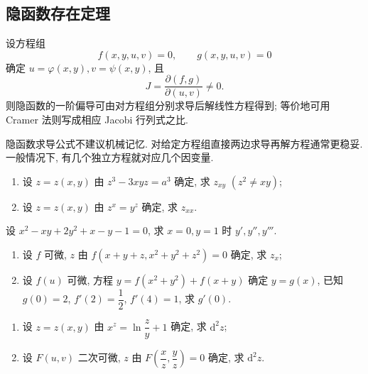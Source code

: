 \documentclass[../数学分析培优讲义.tex]{subfiles}
\begin{document}
\subsection{隐函数存在定理}

\begin{theorem}[\markstar]
设方程组
\[
    f(x,y,u,v)=0,\qquad g(x,y,u,v)=0
\]
确定 $u=\varphi(x,y),v=\psi(x,y)$, 且
\[
    J=\dfrac{\partial(f,g)}{\partial(u,v)}\ne0.
\]
则隐函数的一阶偏导可由对方程组分别求导后解线性方程得到; 等价地可用 Cramer 法则写成相应 Jacobi 行列式之比.
\end{theorem}

\begin{remark}
隐函数求导公式不建议机械记忆. 对给定方程组直接两边求导再解方程通常更稳妥. 一般情况下, 有几个独立方程就对应几个因变量.
\end{remark}


\newpage


\begin{example}
\begin{enumerate}[label=(\arabic*)]
    \item 设 $z=z(x,y)$ 由 $z^3-3xyz=a^3$ 确定, 求 $z_{xy}$ $(z^2\ne xy)$;
    \item 设 $z=z(x,y)$ 由 $z^x=y^z$ 确定, 求 $z_{xx}$.
\end{enumerate}
\end{example}
\exampleblank

\begin{example}
设 $x^2-xy+2y^2+x-y-1=0$, 求 $x=0,y=1$ 时 $y',y'',y'''$.
\end{example}
\exampleblank

\begin{example}
\begin{enumerate}[label=(\arabic*)]
    \item 设 $f$ 可微, $z$ 由 $f(x+y+z,x^2+y^2+z^2)=0$ 确定, 求 $z_x$;
    \item 设 $f(u)$ 可微, 方程 $y=f(x^2+y^2)+f(x+y)$ 确定 $y=g(x)$, 已知 $g(0)=2$, $f'(2)=\dfrac{1}{2}$, $f'(4)=1$, 求 $g'(0)$.
\end{enumerate}
\end{example}
\exampleblank

\begin{example}
\begin{enumerate}[label=(\arabic*)]
    \item 设 $z=z(x,y)$ 由 $\displaystyle x^z=\ln\dfrac{z}{y}+1$ 确定, 求 $\mathrm{d}^2z$;
    \item 设 $F(u,v)$ 二次可微, $z$ 由 $\displaystyle F\left(\dfrac{x}{z},\dfrac{y}{z}\right)=0$ 确定, 求 $\mathrm{d}^2z$.
\end{enumerate}
\end{example}
\exampleblank
\end{document}
